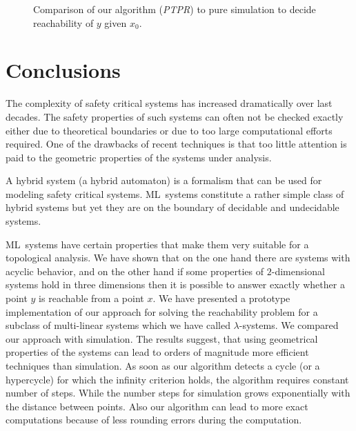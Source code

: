 \documentclass[copyright,creativecommons]{packages/eptcs}
\newcommand{\ml}{\mbox{ML}}
\begin{document}
\begin{figure}[tb]
  \centering
  \caption{Comparison of our algorithm (\emph{PTPR}) to pure simulation to decide reachability of $y$ given $x_0$.}
  \label{fig:experiment}
\end{figure}



\section{Conclusions}\label{sec:conclusions}

The complexity of safety critical systems has increased dramatically over last decades. 
The safety properties of such systems  can often not be checked exactly  either due to theoretical boundaries or due to too large
computational efforts required. One of the drawbacks of recent techniques is that too little attention is paid to the geometric properties of the systems under analysis.

A hybrid system (a hybrid automaton) is a formalism that can be used  for modeling safety critical systems. \ml~systems constitute a rather simple class of hybrid systems but yet they are on the boundary of decidable and undecidable systems.  

\ml~systems have certain properties that make them very suitable for a topological analysis. 
 We have shown that on the one hand there are systems with acyclic behavior, and on the other hand if
some properties of $2$-dimensional systems hold in three dimensions then it is possible to answer  exactly  whether a point $y$ is reachable from a point $x$.   
We have presented a prototype implementation of our approach for solving the reachability problem for a subclass of multi-linear systems which we have called $\lambda$-systems.
We compared our approach  with simulation. The results  suggest, that using geometrical properties of the systems can lead  to  orders of magnitude more efficient techniques than simulation.
As soon as our algorithm detects a cycle (or a hypercycle) for which the infinity criterion holds, the algorithm requires constant number of steps. While the number steps for simulation grows exponentially with the distance between points. 
Also  our algorithm can lead to more exact computations because of  less rounding errors during the computation. 








\end{document}
